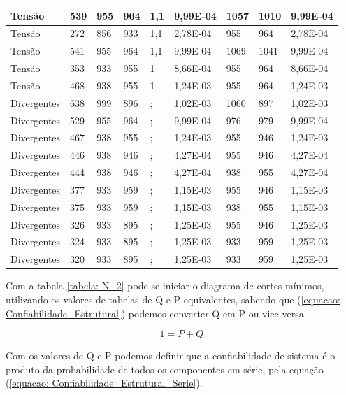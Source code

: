 \documentclass[lettersize,journal]{IEEEtran}
\begin{document}
\begin{table}[!ht]
\begin{tabularx}{.5\textwidth}{|Y|Y|Y|Y|Y|Y|Y|Y|Y|}
		Tensão & 539 & 955 & 964 & 1,1 & 9,99E-04 & 1057 & 1010 & 9,99E-04 \\ \hline
		Tensão & 272 & 856 & 933 & 1,1 & 2,78E-04 & 955 & 964 & 2,78E-04 \\ \hline
		Tensão & 541 & 955 & 964 & 1,1 & 9,99E-04 & 1069 & 1041 & 9,99E-04 \\ \hline
		Tensão & 353 & 933 & 955 & 1 & 8,66E-04 & 955 & 964 & 8,66E-04 \\ \hline
		Tensão & 468 & 938 & 955 & 1 & 1,24E-03 & 955 & 964 & 1,24E-03 \\ \hline
		Divergentes & 638 & 999 & 896 & ; & 1,02E-03 & 1060 & 897 & 1,02E-03 \\ \hline
		Divergentes & 529 & 955 & 964 & ; & 9,99E-04 & 976 & 979 & 9,99E-04 \\ \hline
		Divergentes & 467 & 938 & 955 & ; & 1,24E-03 & 955 & 946 & 1,24E-03 \\ \hline
		Divergentes & 446 & 938 & 946 & ; & 4,27E-04 & 955 & 946 & 4,27E-04 \\ \hline
		Divergentes & 444 & 938 & 946 & ; & 4,27E-04 & 938 & 955 & 4,27E-04 \\ \hline
		Divergentes & 377 & 933 & 959 & ; & 1,15E-03 & 955 & 946 & 1,15E-03 \\ \hline
		Divergentes & 375 & 933 & 959 & ; & 1,15E-03 & 938 & 955 & 1,15E-03 \\ \hline
		Divergentes & 326 & 933 & 895 & ; & 1,25E-03 & 955 & 946 & 1,25E-03 \\ \hline
		Divergentes & 324 & 933 & 895 & ; & 1,25E-03 & 933 & 959 & 1,25E-03 \\ \hline
		Divergentes & 320 & 933 & 895 & ; & 1,25E-03 & 933 & 959 & 1,25E-03 \\ \hline
	\end{tabularx}
\end{table}

Com a tabela \ref{tabela: N_2} pode-se iniciar o diagrama de cortes mínimos, utilizando os valores de tabelas de Q e P equivalentes, sabendo que (\ref{equacao: Confiabilidade_Estrutural}) podemos converter Q em P ou vice-versa.

\begin{equation}
	1 = P + Q
	\label{equacao: Confiabilidade_Estrutural}
\end{equation}

Com os valores de Q e P podemos definir que a confiabilidade de sistema é o produto da probabilidade de todos os componentes em série, pela equação (\ref{equacao: Confiabilidade_Estrutural_Serie}).
\end{document}
